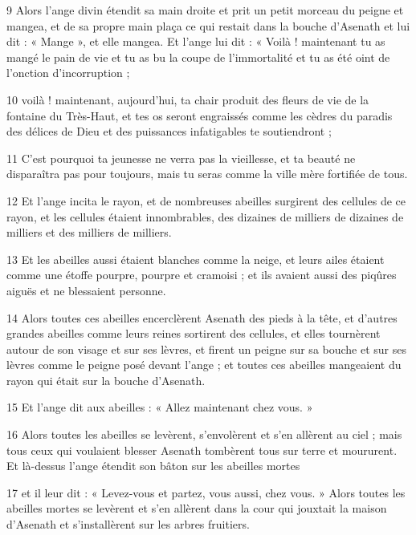 \par 9 Alors l'ange divin étendit sa main droite et prit un petit morceau du peigne et mangea, et de sa propre main plaça ce qui restait dans la bouche d'Asenath et lui dit : « Mange », et elle mangea. Et l'ange lui dit : « Voilà ! maintenant tu as mangé le pain de vie et tu as bu la coupe de l'immortalité et tu as été oint de l'onction d'incorruption ;

\par 10 voilà ! maintenant, aujourd'hui, ta chair produit des fleurs de vie de la fontaine du Très-Haut, et tes os seront engraissés comme les cèdres du paradis des délices de Dieu et des puissances infatigables te soutiendront ;

\par 11 C'est pourquoi ta jeunesse ne verra pas la vieillesse, et ta beauté ne disparaîtra pas pour toujours, mais tu seras comme la ville mère fortifiée de tous.

\par 12 Et l'ange incita le rayon, et de nombreuses abeilles surgirent des cellules de ce rayon, et les cellules étaient innombrables, des dizaines de milliers de dizaines de milliers et des milliers de milliers.

\par 13 Et les abeilles aussi étaient blanches comme la neige, et leurs ailes étaient comme une étoffe pourpre, pourpre et cramoisi ; et ils avaient aussi des piqûres aiguës et ne blessaient personne.

\par 14 Alors toutes ces abeilles encerclèrent Asenath des pieds à la tête, et d'autres grandes abeilles comme leurs reines sortirent des cellules, et elles tournèrent autour de son visage et sur ses lèvres, et firent un peigne sur sa bouche et sur ses lèvres comme le peigne posé devant l'ange ; et toutes ces abeilles mangeaient du rayon qui était sur la bouche d'Asenath.

\par 15 Et l'ange dit aux abeilles : « Allez maintenant chez vous. »

\par 16 Alors toutes les abeilles se levèrent, s'envolèrent et s'en allèrent au ciel ; mais tous ceux qui voulaient blesser Asenath tombèrent tous sur terre et moururent. Et là-dessus l'ange étendit son bâton sur les abeilles mortes

\par 17 et il leur dit : « Levez-vous et partez, vous aussi, chez vous. » Alors toutes les abeilles mortes se levèrent et s'en allèrent dans la cour qui jouxtait la maison d'Asenath et s'installèrent sur les arbres fruitiers.

